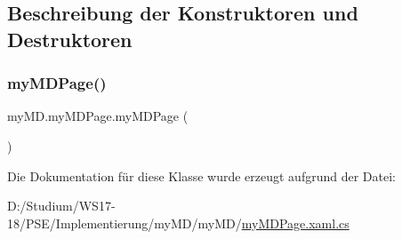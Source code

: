 \subsection{Beschreibung der Konstruktoren und Destruktoren}
\mbox{\label{classmy_m_d_1_1my_m_d_page_a116c2084cfab3cc170d6f0c0d32e92c7}} 
\subsubsection{\texorpdfstring{my\+M\+D\+Page()}{myMDPage()}}
{\footnotesize\ttfamily my\+M\+D.\+my\+M\+D\+Page.\+my\+M\+D\+Page (\begin{DoxyParamCaption}{ }\end{DoxyParamCaption})}



Die Dokumentation für diese Klasse wurde erzeugt aufgrund der Datei\+:\begin{DoxyCompactItemize}
\item 
D\+:/\+Studium/\+W\+S17-\/18/\+P\+S\+E/\+Implementierung/my\+M\+D/my\+M\+D/\mbox{\hyperlink{my_m_d_page_8xaml_8cs}{my\+M\+D\+Page.\+xaml.\+cs}}\end{DoxyCompactItemize}
